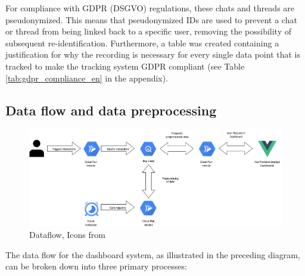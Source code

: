 \documentclass[
	english,
	ruledheaders=section,%
	class=report,%
	thesis={type=bachelor},%
	accentcolor=1b,%
	custommargins=true,%
	marginpar=false,%
	parskip=half-,%
	fontsize=11pt,%
	DIV=14,
]{tudapub}
\begin{document}
For compliance with GDPR (DSGVO) \parencite{DSGVO_2024} regulations, these chats and threads are pseudonymized. This means that pseudonymized IDs are used to prevent a chat or thread from being linked back to a specific user, removing the possibility of subsequent re-identification. Furthermore, a table was created containing a justification for why the recording is necessary for every single data point that is tracked to make the tracking system GDPR compliant (see Table \ref{tab:gdpr_compliance_en} in the appendix).
\subsection{Data flow and data preprocessing}
\begin{figure}
    \centering
    \includegraphics[width=1\linewidth]{images/DataFlow_Bachelorthesis.drawio.png}
    \caption{Dataflow, Icons from \parencite{icon1, icon2, icon3, icon4, icon5}}
    \label{fig:enter-label}
\end{figure}
The data flow for the dashboard system, as illustrated in the preceding diagram, can be broken down into three primary processes:
\end{document}
